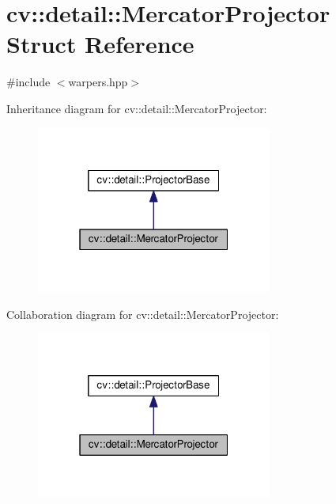 \hypertarget{structcv_1_1detail_1_1MercatorProjector}{\section{cv\-:\-:detail\-:\-:Mercator\-Projector Struct Reference}
\label{structcv_1_1detail_1_1MercatorProjector}
}


{\ttfamily \#include $<$warpers.\-hpp$>$}



Inheritance diagram for cv\-:\-:detail\-:\-:Mercator\-Projector\-:\nopagebreak
\begin{figure}[H]
\begin{center}
\leavevmode
\includegraphics[width=220pt]{structcv_1_1detail_1_1MercatorProjector__inherit__graph}
\end{center}
\end{figure}


Collaboration diagram for cv\-:\-:detail\-:\-:Mercator\-Projector\-:\nopagebreak
\begin{figure}[H]
\begin{center}
\leavevmode
\includegraphics[width=220pt]{structcv_1_1detail_1_1MercatorProjector__coll__graph}
\end{center}
\end{figure}

